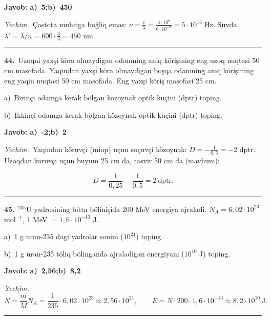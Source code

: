\documentclass[11pt,a4paper]{article}
\begin{document}
\noindent\colorbox{gray!12}{\parbox{\dimexpr\linewidth-2\fboxsep}{\textbf{Javob: a)\ 5;\quad b)\ 450}}}\par\smallskip
\noindent\textit{Yechim.}\ Çastota muhitga boğliq emas: $\nu=\frac{c}{\lambda}=\frac{3\cdot10^8}{6\cdot10^{-7}}=5\cdot10^{14}$ Hz. Suvda $\lambda'=\lambda/n=600\cdot\frac34=450$ nm.\par\par\medskip\hrule\medskip
{}\noindent\textbf{44.}\ Uzoqni yaxşi köra olmaydigan odamning aniq körişining eng uzoq nuqtasi 50 cm masofada. Yaqindan yaxşi köra olmaydigan boşqa odamning aniq körişining eng yaqin nuqtasi 50 cm masofada. Eng yaxşi köriş masofasi 25 cm.\par
\noindent\hspace*{4mm}a)\ Birinçi odamga kerak bölgan közoynak optik kuçini (dptr) toping.\par
\noindent\hspace*{4mm}b)\ Ikkinçi odamga kerak bölgan közoynak optik kuçini (dptr) toping.\par
\noindent\colorbox{gray!12}{\parbox{\dimexpr\linewidth-2\fboxsep}{\textbf{Javob: a)\ -2;\quad b)\ 2}}}\par\smallskip
\noindent\textit{Yechim.}\ Yaqindan köruvçi (miop) uçun soçuvçi közoynak: $D=-\frac{1}{0{,}5}=-2$ dptr. Uzoqdan köruvçi uçun buyum 25 cm da, tasvir 50 cm da (mavhum):\par
\[D=\frac{1}{0{,}25}-\frac{1}{0{,}5}=2\ \text{dptr}.\]\par\medskip\hrule\medskip
{}\noindent\textbf{45.}\ $^{235}$U yadrosining bitta bölinişida 200 MeV energiya ajraladi. $N_A=6{,}02\cdot10^{23}$ mol$^{-1}$, 1 MeV $=1{,}6\cdot10^{-13}$ J.\par
\noindent\hspace*{4mm}a)\ 1 g uran-235 dagi yadrolar sonini ($10^{21}$) toping.\par
\noindent\hspace*{4mm}b)\ 1 g uran-235 töliq bölinganda ajraladigan energiyani ($10^{10}$ J) toping.\par
\noindent\colorbox{gray!12}{\parbox{\dimexpr\linewidth-2\fboxsep}{\textbf{Javob: a)\ 2,56;\quad b)\ 8,2}}}\par\smallskip
\noindent\textit{Yechim.}\ \[N=\frac{m}{M}N_A=\frac{1}{235}\cdot6{,}02\cdot10^{23}\approx2{,}56\cdot10^{21},\qquad E=N\cdot200\cdot1{,}6\cdot10^{-13}\approx8{,}2\cdot10^{10}\ \text{J}.\]\par\medskip\hrule\medskip
\end{document}
